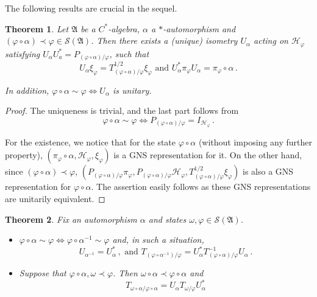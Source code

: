 \documentclass[12pt]{amsart}
\numberwithin{equation}{section}
\def\ch{{\mathcal H}}
\def\cs{{\mathcal S}}
\def\ga{{\mathfrak A}} \def\gpa{{\mathfrak a}}
\def\a{\alpha}
\def\f{\varphi}\def\ff{\phi} \def\F{\Phi}
\def\om{\omega} \def\Om{\Omega}
\newtheorem{thm}{Theorem}[section]
\begin{document}
The following results are crucial in the sequel. 
\begin{thm}
\label{twogns}
Let $\ga$ be a $C^*$-algebra, $\a$ a $*$-automorphism and $(\f\circ\a)\prec\f\in\cs(\ga)$. Then there exists a (unique) isometry $U_\a$ acting on $\ch_\f$ satisfying $U_\a U_a^*=P_{(\f\circ\a)/\f}$, such that
$$
U_\a\xi_\f=T^{1/2}_{(\f\circ\a)/\f}\xi_\f\,\,\text{and}\,\, U^*_\a\pi_\f U_\a=\pi_\f\circ\a\,.
$$

In addition, $\f\circ\a\sim\f\iff U_\a$ is unitary.
\end{thm}
\begin{proof}
The uniqueness is trivial, and the last part follows from 
$$
\f\circ\a\sim\f\iff P_{(\f\circ\a)/\f}=I_{\ch_\f}\,.
$$

For the existence, we notice that for the state $\f\circ\a$ (without imposing any further property), $(\pi_\f\circ\a,\ch_\f,\xi_\f)$ is a GNS representation for it. On the other hand, since  $(\f\circ\a)\prec\f$, $(P_{(\f\circ\a)/\f}\pi_\f,P_{(\f\circ\a)/\f}\ch_\f,T^{1/2}_{(\f\circ\a)/\f}\xi_\f)$ is also a GNS representation for $\f\circ\a$. The assertion easily follows as these GNS representations are unitarily equivalent.
\end{proof}
\begin{thm}
\label{multrac}
Fix an automorphism $\a$ and states $\om,\f\in\cs(\ga)$.
\begin{itemize}
\item[(i)] $\f\circ\a\sim\f\iff\f\circ\a^{-1}\sim\f$ and, in such a situation,
\begin{equation}
\label{aamu}
U_{\a^{-1}}=U_\a^*\,,\,\,\text{and}\,\, T_{(\f\circ\a^{-1})/\f}=U^*_\a T_{(\f\circ\a)/\f}^{-1}U_\a\,.
\end{equation}
\item[(ii)] Suppose that $\f\circ\a,\om\prec\f$. Then $\om\circ\a\prec\f\circ\a$ and
\begin{equation*}
T_{\om\circ\a/\f\circ\a}=U_\a T_{\om/\f}U_\a^*
\end{equation*}
\end{itemize}
\end{thm}
\end{document}
